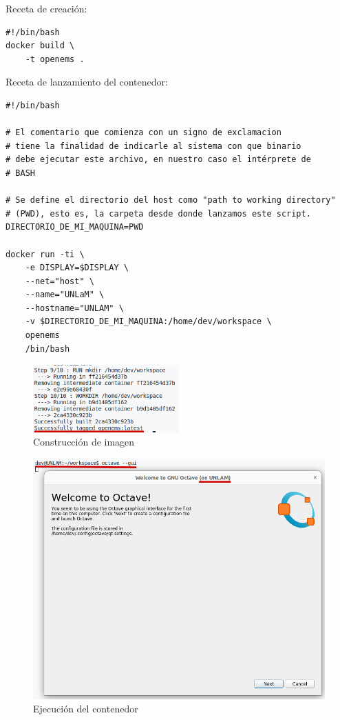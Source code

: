 \documentclass[
    11pt,
    spanish,
	a4paper
]{article}
\begin{document}
Receta de creación:

\begin{verbatim}
#!/bin/bash
docker build \
    -t openems .
\end{verbatim}

Receta de lanzamiento del contenedor:

\begin{verbatim}
#!/bin/bash

# El comentario que comienza con un signo de exclamacion
# tiene la finalidad de indicarle al sistema con que binario
# debe ejecutar este archivo, en nuestro caso el intérprete de
# BASH

# Se define el directorio del host como "path to working directory"
# (PWD), esto es, la carpeta desde donde lanzamos este script.
DIRECTORIO_DE_MI_MAQUINA=PWD

docker run -ti \
    -e DISPLAY=$DISPLAY \
    --net="host" \
    --name="UNLaM" \
    --hostname="UNLAM" \
    -v $DIRECTORIO_DE_MI_MAQUINA:/home/dev/workspace \
    openems
    /bin/bash
\end{verbatim}

\begin{figure}[htbp]
	\centering
	\includegraphics[width=0.5\textwidth]{./img/docker-build.png}
	\caption{Construcción de imagen}
	\label{fig:dockerbuild}
\end{figure}

\begin{figure}[htbp]
	\centering
	\includegraphics[width=\textwidth]{./img/docker-run.png}
	\caption{Ejecución del contenedor}
	\label{fig:dockerrun}
\end{figure}
\end{document}
